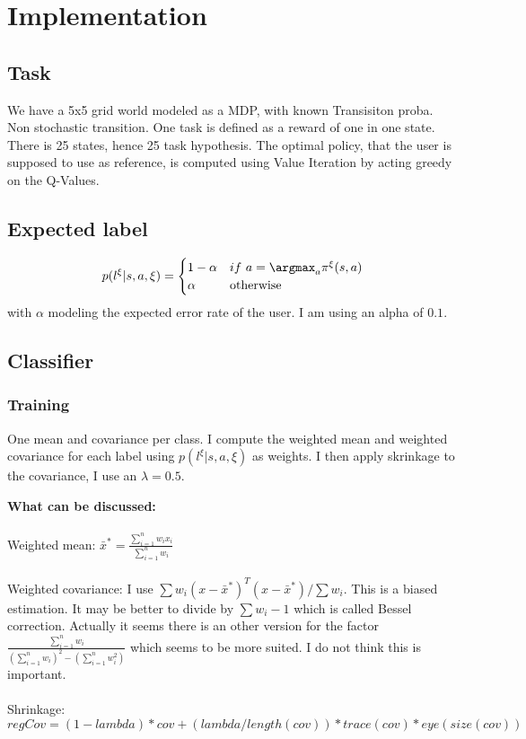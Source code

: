 \section{Implementation}
\subsection{Task}

We have a 5x5 grid world modeled as a MDP, with known Transisiton proba. Non stochastic transition.
One task is defined as a reward of one in one state. There is 25 states, hence 25 task hypothesis.
The optimal policy, that the user is supposed to use as reference, is computed using Value Iteration by acting greedy on the Q-Values.

\subsection{Expected label}
\begin{equation*}
    p(l^\xi | s, a, \xi) = 
    \begin{cases}
	1-\alpha               & if~a = \argmax_a \pi^{\xi}(s,a)\\
        \alpha             & \text{otherwise}\\
   \end{cases}
\end{equation*}
with $\alpha$ modeling the expected error rate of the user. I am using an alpha of $0.1$.

\subsection{Classifier}
\subsubsection{Training}

One mean and covariance per class. I compute the weighted mean and weighted covariance for each label using $p(l^\xi | s, a, \xi)$ as weights. I then apply skrinkage to the covariance, I use an $\lambda = 0.5$.

\textbf{What can be discussed:} \\
\\
Weighted mean: $\bar{x}^* = \frac{\sum_{i=1}^n w_i x_i}{\sum_{i=1}^n w_i}$
\\
\\
Weighted covariance: I use $\sum w_i (x - \bar{x}^*)^T  (x - \bar{x}^*) / \sum w_i$. This is a biased estimation. It may be better to divide by $\sum w_i - 1$ which is called Bessel correction. Actually it seems there is an other version for the factor $\frac{\sum_{i=1}^n w_i}{(\sum_{i=1}^n w_i)^2-(\sum_{i=1}^n {w_i^2})}$ which seems to be more suited. I do not think this is important.
\\
\\
Shrinkage: $regCov = (1 - lambda) * cov + (lambda / length(cov)) * trace(cov) * eye(size(cov))$

